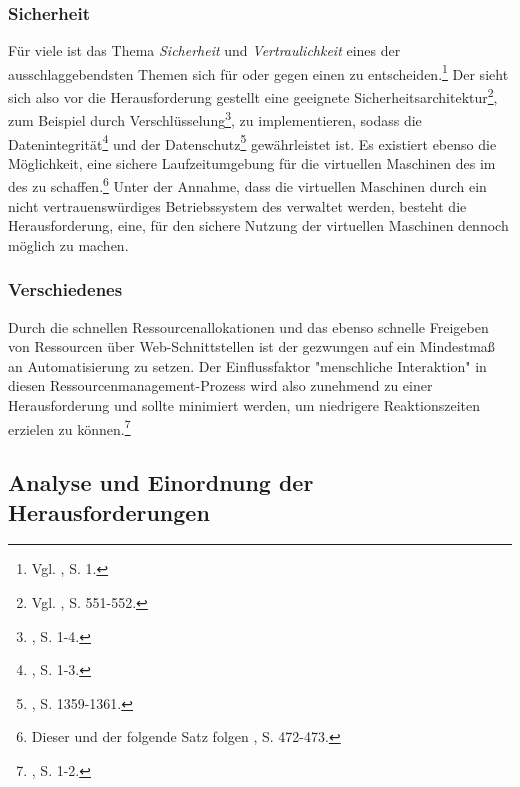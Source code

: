 \subsubsection{Sicherheit}
Für viele \CSU ist das Thema \emph{Sicherheit} und \emph{Vertraulichkeit} eines der ausschlaggebendsten Themen sich für oder gegen einen \CSP zu entscheiden.\footnote{Vgl. \cite{Wang.2012b}, S. 1.}
Der \CSP sieht sich also vor die Herausforderung gestellt eine geeignete Sicherheitsarchitektur\footnote{Vgl. \cite{Chard.2012}, S. 551-552.}, zum Beispiel  durch Verschlüsselung\footnote{\cite{Yu.2013}, S. 1-4.}, zu implementieren, sodass die Datenintegrität\footnote{\cite{Wang.2013}, S. 1-3.} und der Datenschutz\footnote{\cite{Chadwick.2012}, S. 1359-1361.} gewährleistet ist.
\newline
Es existiert ebenso die Möglichkeit, eine sichere Laufzeitumgebung für die virtuellen Maschinen des \CSUs im \CS des \CSPs zu schaffen.\footnote{Dieser und der folgende Satz folgen \cite{Li.2012}, S. 472-473.}
Unter der Annahme, dass die virtuellen Maschinen durch ein nicht vertrauenswürdiges Betriebssystem des \CSPs verwaltet werden, besteht die Herausforderung, eine, für den \CSUComma sichere Nutzung der virtuellen Maschinen dennoch möglich zu machen.

\subsubsection{Verschiedenes}
Durch die schnellen Ressourcenallokationen und das ebenso schnelle Freigeben von Ressourcen über Web-Schnittstellen ist der \CSP gezwungen auf ein Mindestmaß an Automatisierung zu setzen. Der Einflussfaktor "menschliche Interaktion" in diesen Ressourcenmanagement-Prozess wird also zunehmend zu einer Herausforderung und sollte minimiert werden, um niedrigere Reaktionszeiten erzielen zu können.\footnote{\cite{Kecskemeti.2013}, S. 1-2.}

\subsection{Analyse und Einordnung der Herausforderungen}

